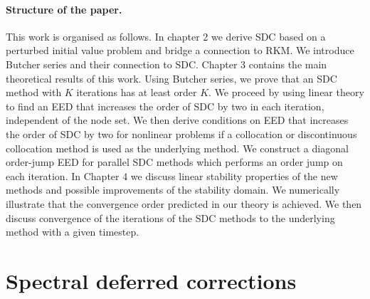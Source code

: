 \documentclass[sn-mathphys-num]{sn-jnl}%
\newcommand{\reva}[1]{#1}%
\theoremstyle{thmstyleone}%
\theoremstyle{thmstyletwo}%
\theoremstyle{thmstylethree}%
\begin{document}
\paragraph{Structure of the paper.}
This work is organised as follows. In chapter 2 we derive SDC based on a perturbed initial value problem and bridge a connection to RKM. We introduce Butcher series and their connection to SDC. Chapter 3 contains the main theoretical results of this work. Using Butcher series, we prove that an SDC method with $K$ iterations has at least order $K$. We proceed by using linear theory to find an EED that increases the order of SDC by two in each iteration, independent of the node set. We then derive conditions on EED that increases the order of SDC by two for nonlinear problems if a collocation \reva{or discontinuous} collocation method is used as the underlying method. We construct a diagonal order-jump EED for parallel SDC methods which performs an order jump on each iteration. In Chapter 4 we discuss linear stability properties of the new methods and possible improvements of the stability domain. We numerically illustrate that the convergence order predicted in our theory is achieved. We then discuss convergence of the iterations of the SDC methods to the underlying method with a given timestep. 


\section{Spectral deferred corrections}\label{sec:sdc}
\end{document}
